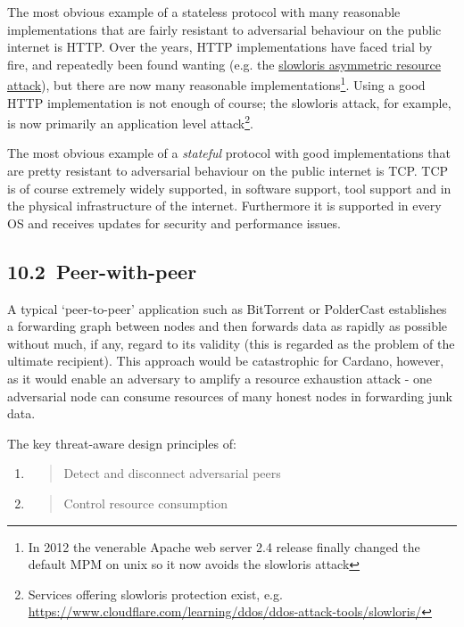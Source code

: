 \documentclass[11pt,a4paper]{article}
\begin{document}
The most obvious example of a stateless protocol with many reasonable
implementations that are fairly resistant to adversarial behaviour on
the public internet is HTTP. Over the years, HTTP implementations have
faced trial by fire, and repeatedly been found wanting (e.g. the
\href{https://en.wikipedia.org/wiki/Slowloris_(computer_security)}{{slowloris
asymmetric resource attack}}), but there are now many reasonable
implementations\footnote{In 2012 the venerable Apache web server 2.4
  release finally changed the default MPM on unix so it now avoids the
  slowloris attack}. Using a good HTTP implementation is not enough of
course; the slowloris attack, for example, is now primarily an
application level attack\footnote{Services offering slowloris protection
  exist, e.g.
  \href{https://www.cloudflare.com/learning/ddos/ddos-attack-tools/slowloris/}{{https://www.cloudflare.com/learning/ddos/ddos-attack-tools/slowloris/}}}.

The most obvious example of a \emph{stateful} protocol with good
implementations that are pretty resistant to adversarial behaviour on
the public internet is TCP. TCP is of course extremely widely supported,
in software support, tool support and in the physical infrastructure of
the internet. Furthermore it is supported in every OS and receives
updates for security and performance issues.

\hypertarget{peer-with-peer}{%
\subsection{​10.2​~Peer-with-peer}\label{peer-with-peer}}

A typical `peer-to-peer' application such as BitTorrent or PolderCast
establishes a forwarding graph between nodes and then forwards data as
rapidly as possible without much, if any, regard to its validity (this
is regarded as the problem of the ultimate recipient). This approach
would be catastrophic for Cardano, however, as it would enable an
adversary to amplify a resource exhaustion attack - one adversarial node
can consume resources of many honest nodes in forwarding junk data.

The key threat-aware design principles of:

\begin{enumerate}
\def\labelenumi{\arabic{enumi}.}
\item
  \begin{quote}
  Detect and disconnect adversarial peers
  \end{quote}
\item
  \begin{quote}
  Control resource consumption
  \end{quote}
\end{enumerate}
\end{document}
